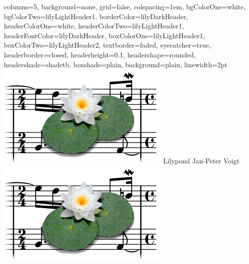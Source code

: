 \documentclass[a0paper,landscape]{baposter}
\begin{document}
\begin{poster}{%
	columns=5,
	background=none,
	grid=false,
	colspacing=1em,
	bgColorOne=white,
	bgColorTwo=lilyLightHeader1,
	borderColor=lilyDarkHeader,
	headerColorOne=white,
	headerColorTwo=lilyLightHeader1,
	headerFontColor=lilyDarkHeader,
	boxColorOne=lilyLightHeader1,
	boxColorTwo=lilyLightHeader2,
	textborder=faded,
	eyecatcher=true,
	headerborder=closed,
	headerheight=0.1\textheight,
	headershape=rounded,
	headershade=shadetb,
	boxshade=plain,
	background=plain,
	linewidth=2pt
	}
  {
  	\includegraphics[width=0.14\linewidth]{double-lily-modified3.png}
  }
  {Lilypond}
  {Jan-Peter Voigt}
  {\includegraphics[width=.14\textwidth]{double-lily-modified3.png}}

  
\end{poster}
\end{document}

